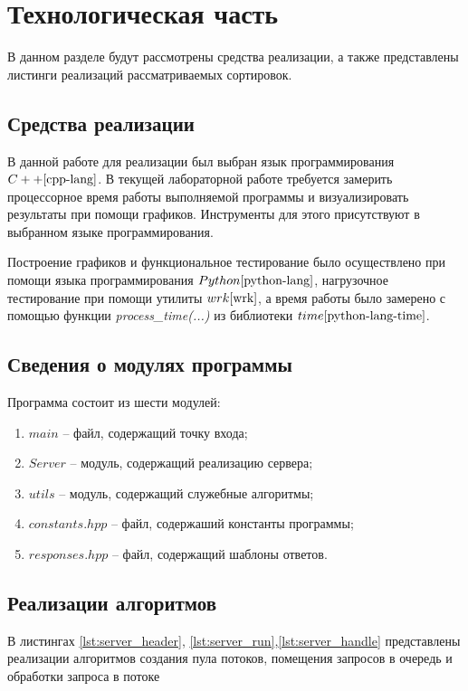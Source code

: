 \chapter{Технологическая часть}

В данном разделе будут рассмотрены средства реализации, а также представлены листинги реализаций рассматриваемых сортировок.

\section{Средства реализации}
В данной работе для реализации был выбран язык программирования $C++\cite{cpp-lang}$. В текущей лабораторной работе требуется замерить процессорное время работы выполняемой программы
и визуализировать результаты при помощи графиков. Инструменты для этого присутствуют в выбранном языке программирования.

Построение графиков и функциональное тестирование было осуществлено при помощи языка программирования $Python \cite{python-lang}$, нагрузочное тестирование при помощи утилиты $wrk \cite{wrk}$, а время работы было замерено с помощью функции \textit{process\_time(...)} из библиотеки $time \cite{python-lang-time}$.

\section{Сведения о модулях программы}
Программа состоит из шести модулей:
\begin{enumerate}[label=\arabic*)]
	\item $main$ -- файл, содержащий точку входа;
	\item $Server$ -- модуль, содержащий реализацию сервера;
	\item $utils$ -- модуль, содержащий служебные алгоритмы;
	\item $constants.hpp$ -- файл, содержаший константы программы;
	\item $responses.hpp$ -- файл, содержащий шаблоны ответов. \newline
\end{enumerate}


\section{Реализации алгоритмов}

В листингах \ref{lst:server_header}, \ref{lst:server_run},\ref{lst:server_handle} представлены реализации алгоритмов создания пула потоков, помещения запросов в очередь и обработки запроса в потоке\clearpage

